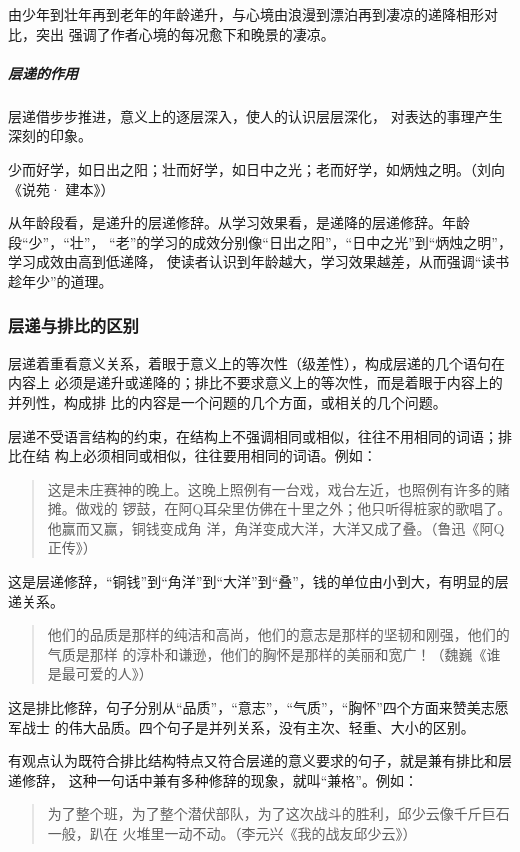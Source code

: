 \documentclass[final,oneside]{ctexbook}
\newenvironment{equotation}{\begin{quotation}\kaishu}{\end{quotation}}
\begin{document}
由少年到壮年再到老年的年龄递升，与心境由浪漫到漂泊再到凄凉的递降相形对比，突出
强调了作者心境的每况愈下和晚景的凄凉。

\subparagraph{层递的作用}层递借步步推进，意义上的逐层深入，使人的认识层层深化，
对表达的事理产生深刻的印象。

少而好学，如日出之阳；壮而好学，如日中之光；老而好学，如炳烛之明。（刘向《说苑·
建本》）

从年龄段看，是递升的层递修辞。从学习效果看，是递降的层递修辞。年龄段“少”，“壮”，
“老”的学习的成效分别像“日出之阳”，“日中之光”到“炳烛之明”，学习成效由高到低递降，
使读者认识到年龄越大，学习效果越差，从而强调“读书趁年少”的道理。

\subsubsection{层递与排比的区别}

层递着重看意义关系，着眼于意义上的等次性（级差性），构成层递的几个语句在内容上
必须是递升或递降的；排比不要求意义上的等次性，而是着眼于内容上的并列性，构成排
比的内容是一个问题的几个方面，或相关的几个问题。

层递不受语言结构的约束，在结构上不强调相同或相似，往往不用相同的词语；排比在结
构上必须相同或相似，往往要用相同的词语。例如：

\begin{equotation}
  这是未庄赛神的晚上。这晚上照例有一台戏，戏台左近，也照例有许多的赌摊。做戏的
  锣鼓，在阿Q耳朵里仿佛在十里之外；他只听得桩家的歌唱了。他赢而又赢，铜钱变成角
  洋，角洋变成大洋，大洋又成了叠。（鲁迅《阿Q正传》）
\end{equotation}
这是层递修辞，“铜钱”到“角洋”到“大洋”到“叠”，钱的单位由小到大，有明显的层递关系。

\begin{equotation}
  他们的品质是那样的纯洁和高尚，他们的意志是那样的坚韧和刚强，他们的气质是那样
  的淳朴和谦逊，他们的胸怀是那样的美丽和宽广！（魏巍《谁是最可爱的人》）
\end{equotation}
这是排比修辞，句子分别从“品质”，“意志”，“气质”，“胸怀”四个方面来赞美志愿军战士
的伟大品质。四个句子是并列关系，没有主次、轻重、大小的区别。

有观点认为既符合排比结构特点又符合层递的意义要求的句子，就是兼有排比和层递修辞，
这种一句话中兼有多种修辞的现象，就叫“兼格”。例如：

\begin{equotation}
  为了整个班，为了整个潜伏部队，为了这次战斗的胜利，邱少云像千斤巨石一般，趴在
  火堆里一动不动。（李元兴《我的战友邱少云》）
\end{equotation}
\end{document}
